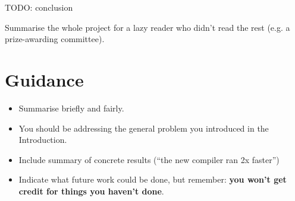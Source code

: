 \documentclass{l4proj}
\begin{document}
TODO: conclusion

Summarise the whole project for a lazy reader who didn't read the rest (e.g. a prize-awarding committee).
\section{Guidance}
\begin{itemize}
    \item
        Summarise briefly and fairly.
    \item
        You should be addressing the general problem you introduced in the
        Introduction.        
    \item
        Include summary of concrete results (``the new compiler ran 2x
        faster'')
    \item
        Indicate what future work could be done, but remember: \textbf{you
        won't get credit for things you haven't done}.
\end{itemize}

%
% 
\end{document}
